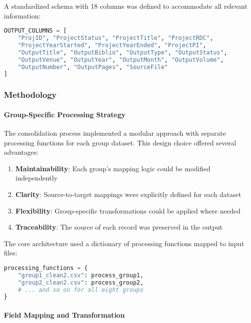 \documentclass[12pt]{article}
\providecommand{\tightlist}{%
  \setlength{\itemsep}{0pt}\setlength{\parskip}{0pt}}
\begin{document}
A standardized schema with 18 columns was defined to accommodate all
relevant information:

\begin{lstlisting}[language=Python]
OUTPUT_COLUMNS = [
    "ProjID", "ProjectStatus", "ProjectTitle", "ProjectRDC", 
    "ProjectYearStarted", "ProjectYearEnded", "ProjectPI", 
    "OutputTitle", "OutputBiblio", "OutputType", "OutputStatus", 
    "OutputVenue", "OutputYear", "OutputMonth", "OutputVolume", 
    "OutputNumber", "OutputPages", "SourceFile"
]
\end{lstlisting}

\subsubsection{Methodology}\label{methodology-1}

\paragraph{Group-Specific Processing
Strategy}\label{group-specific-processing-strategy}

The consolidation process implemented a modular approach with separate
processing functions for each group dataset. This design choice offered
several advantages:

\begin{enumerate}
\def\labelenumi{\arabic{enumi}.}
\tightlist
\item
  \textbf{Maintainability}: Each group's mapping logic could be modified
  independently
\item
  \textbf{Clarity}: Source-to-target mappings were explicitly defined
  for each dataset
\item
  \textbf{Flexibility}: Group-specific transformations could be applied
  where needed
\item
  \textbf{Traceability}: The source of each record was preserved in the
  output
\end{enumerate}

The core architecture used a dictionary of processing functions mapped
to input files:

\begin{lstlisting}[language=Python]
processing_functions = {
    "group1_clean2.csv": process_group1,
    "group2_clean2.csv": process_group2,
    # ... and so on for all eight groups
}
\end{lstlisting}

\paragraph{Field Mapping and
Transformation}\label{field-mapping-and-transformation}
\end{document}
